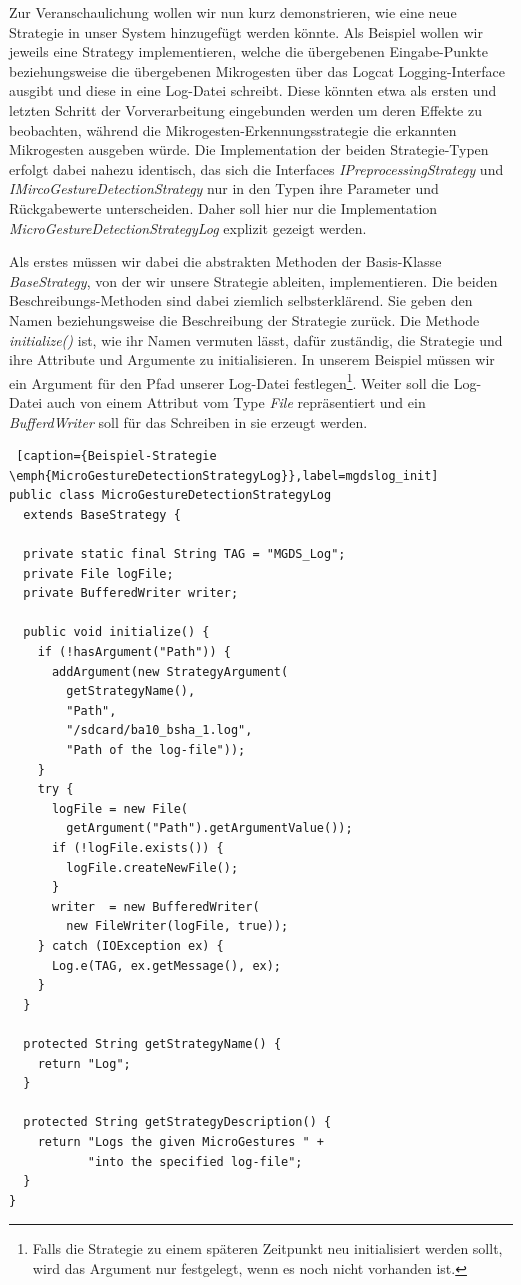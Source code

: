 Zur Veranschaulichung wollen wir nun kurz demonstrieren, wie eine neue Strategie in unser System hinzugefügt werden könnte. Als Beispiel wollen wir jeweils eine Strategy implementieren, welche die übergebenen Eingabe-Punkte beziehungsweise die übergebenen Mikrogesten über das Logcat Logging-Interface ausgibt und diese in eine Log-Datei schreibt. Diese könnten etwa als ersten und letzten Schritt der Vorverarbeitung eingebunden werden um deren Effekte zu beobachten, während die Mikrogesten-Erkennungsstrategie die erkannten Mikrogesten ausgeben würde. Die Implementation der beiden Strategie-Typen erfolgt dabei nahezu identisch, das sich die Interfaces \emph{IPreprocessingStrategy} und \emph{IMircoGestureDetectionStrategy} nur in den Typen ihre Parameter und Rückgabewerte unterscheiden. Daher soll hier nur die Implementation \emph{MicroGestureDetectionStrategyLog} explizit gezeigt werden.

Als erstes müssen wir dabei die abstrakten Methoden der Basis-Klasse \emph{BaseStrategy}, von der wir unsere Strategie ableiten, implementieren. Die beiden Beschreibungs-Methoden sind dabei ziemlich selbsterklärend. Sie geben den Namen beziehungsweise die Beschreibung der Strategie zurück. Die Methode \emph{initialize()} ist, wie ihr Namen vermuten lässt, dafür zuständig, die Strategie und ihre Attribute und Argumente zu initialisieren. In unserem Beispiel müssen wir ein Argument für den Pfad unserer Log-Datei festlegen\footnote{Falls die Strategie zu einem späteren Zeitpunkt neu initialisiert werden sollt, wird das Argument nur festgelegt, wenn es noch nicht vorhanden ist.}. Weiter soll die Log-Datei auch von einem Attribut vom Type \emph{File} repräsentiert und ein \emph{BufferdWriter} soll für das Schreiben in sie erzeugt werden.

\begin{lstlisting} [caption={Beispiel-Strategie \emph{MicroGestureDetectionStrategyLog}},label=mgdslog_init]
public class MicroGestureDetectionStrategyLog 
  extends BaseStrategy {

  private static final String TAG = "MGDS_Log";
  private File logFile;
  private BufferedWriter writer;

  public void initialize() {
    if (!hasArgument("Path")) {
      addArgument(new StrategyArgument(
        getStrategyName(), 
        "Path", 
        "/sdcard/ba10_bsha_1.log", 
        "Path of the log-file"));
    }
    try {
      logFile = new File(
        getArgument("Path").getArgumentValue());
      if (!logFile.exists()) {
        logFile.createNewFile();
      }
      writer  = new BufferedWriter(
        new FileWriter(logFile, true));
    } catch (IOException ex) {
      Log.e(TAG, ex.getMessage(), ex);
    }
  }

  protected String getStrategyName() {
    return "Log";
  }

  protected String getStrategyDescription() {
    return "Logs the given MicroGestures " + 
           "into the specified log-file";
  }
}
\end{lstlisting}

